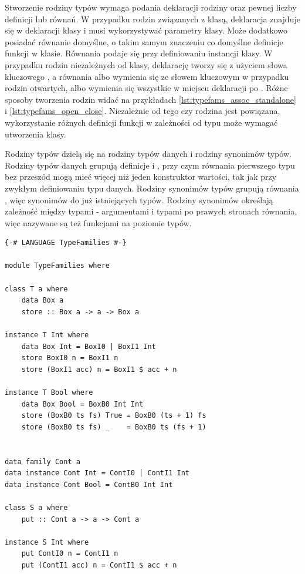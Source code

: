 {Stworzenie rodziny typów wymaga podania deklaracji rodziny oraz pewnej liczby
definicji lub równań. W przypadku rodzin związanych z klasą, deklaracja znajduje
się w deklaracji klasy i musi wykorzystywać parametry klasy. Może dodatkowo
posiadać równanie domyślne, o takim samym znaczeniu co domyślne definicje
funkcji w klasie. Równania podaje się przy definiowaniu instancji klasy. W
przypadku rodzin niezależnych od klasy, deklarację tworzy się z użyciem słowa
kluczowego , a równania albo wymienia się ze słowem kluczowym
 w przypadku rodzin otwartych, albo wymienia się wszystkie w
miejscu deklaracji po . Różne sposoby tworzenia rodzin widać na
przykładach \ref{lst:typefams_assoc_standalone} i
\ref{lst:typefams_open_close}. Niezależnie od tego czy rodzina jest powiązana,
wykorzystanie różnych definicji funkcji w zależności od typu może wymagać
utworzenia klasy.

Rodziny typów dzielą się na rodziny typów danych i rodziny synonimów
typów. Rodziny typów danych grupują definicje  i , przy
czym równania pierwszego typu bez przeszód mogą mieć więcej niż jeden
konstruktor wartości, tak jak przy zwykłym definiowaniu typu danych. Rodziny
synonimów typów grupują równania , więc synonimów do już istniejących
typów. Rodziny synonimów określają zależność między typami - argumentami i
typami po prawych stronach równania, więc nazywane są też funkcjami na poziomie
typów.

\begin{lstlisting}[float,label={lst:typefams_assoc_standalone},
                   caption={Przykład pozwiązanej z klasą i niezależnej rodziny typów.}]
{-# LANGUAGE TypeFamilies #-}

module TypeFamilies where

class T a where
    data Box a
    store :: Box a -> a -> Box a

instance T Int where
    data Box Int = BoxI0 | BoxI1 Int
    store BoxI0 n = BoxI1 n
    store (BoxI1 acc) n = BoxI1 $ acc + n

instance T Bool where
    data Box Bool = BoxB0 Int Int
    store (BoxB0 ts fs) True = BoxB0 (ts + 1) fs
    store (BoxB0 ts fs) _    = BoxB0 ts (fs + 1)


data family Cont a
data instance Cont Int = ContI0 | ContI1 Int
data instance Cont Bool = ContB0 Int Int

class S a where
    put :: Cont a -> a -> Cont a

instance S Int where
    put ContI0 n = ContI1 n
    put (ContI1 acc) n = ContI1 $ acc + n


\end{lstlisting}}
